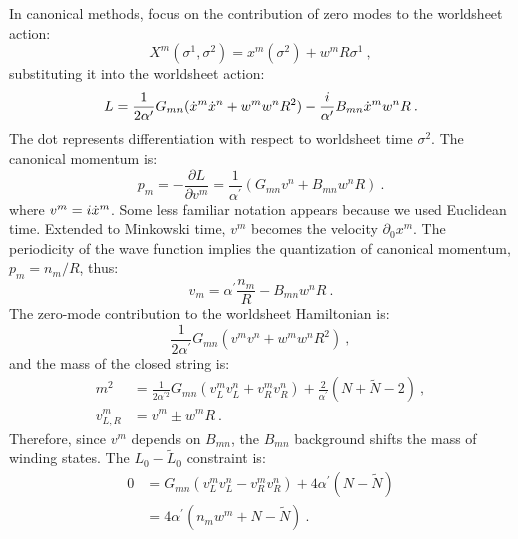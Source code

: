 In canonical methods, focus on the contribution of zero modes to the worldsheet action:
\begin{equation}
	X^{m}(\sigma^{1}, \sigma^{2})=x^{m}(\sigma^{2})+w^{m} R \sigma^{1} \:, \label{8.4.4}
\end{equation}
substituting it into the worldsheet action:
\begin{equation}
	L=\frac{1}{2 \alpha^{\prime}} G_{m n}(\dot{x}^{m} \dot{x}^{n}+w^{m} w^{n} R^{2})
	-\frac{i}{\alpha^{\prime}} B_{m n} \dot{x}^{m} w^{n} R \:. \label{8.4.5}
\end{equation}
The dot represents differentiation with respect to worldsheet time $\sigma^{2}$. The canonical momentum is:
\begin{equation}
	p_{m}=-\frac{\partial L}{\partial v^{m}}=\frac{1}{\alpha^{\prime}}(G_{m n} v^{n}+B_{m n} w^{n} R) \:. \label{8.4.6}
\end{equation}
where $v^{m}=i \dot{x}^{m} $. Some less familiar notation appears because we used Euclidean time. 
Extended to Minkowski time, $v^{m}$ becomes the velocity $\partial_{0} x^{m} $. 
The periodicity of the wave function implies the quantization of canonical momentum, $p_{m}=n_{m} / R$, thus:
\begin{equation}
	v_{m}=\alpha^{\prime} \frac{n_{m}}{R}-B_{m n} w^{n} R \:. \label{8.4.7}
\end{equation}
The zero-mode contribution to the worldsheet Hamiltonian is:
\begin{equation}
	\frac{1}{2 \alpha^{\prime}} G_{m n}(v^{m} v^{n}+w^{m} w^{n} R^{2}) \:, \label{8.4.8}
\end{equation}
and the mass of the closed string is:
\begin{subequations} \label{8.4.9}
	\begin{align}
		m^{2} &= \frac{1}{2 \alpha^{\prime 2}} G_{m n}(v_{L}^{m} v_{L}^{n}+v_{R}^{m} v_{R}^{n})
		+\frac{2}{\alpha^{\prime}}(N+\tilde{N}-2)  \:, \label{8.4.9a} \\
		v_{L, R}^{m} &= v^{m} \pm w^{m} R \:. \label{8.4.9b}
	\end{align}
\end{subequations}
Therefore, since $v^{m}$ depends on $B_{m n}$, the $B_{m n}$ background shifts the mass of winding states. The $L_{0}-\tilde{L}_{0}$ constraint is:
\begin{align}
	0 &=G_{m n}(v_{L}^{m} v_{L}^{n}-v_{R}^{m} v_{R}^{n})+4 \alpha^{\prime}(N-\tilde{N}) \nonumber \\
	&=4 \alpha^{\prime}(n_{m} w^{m}+N-\tilde{N}) \:. \label{8.4.10}
\end{align}

